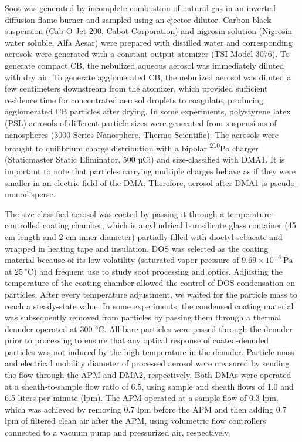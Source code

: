 Soot was generated by incomplete combustion of natural gas in an inverted diffusion flame burner \citep{RN43,RN44} and sampled using an ejector dilutor. Carbon black suspension (Cab-O-Jet 200, Cabot Corporation) and nigrosin solution (Nigrosin water soluble, Alfa Aesar) were prepared with distilled water and corresponding aerosols were generated with a constant output atomizer (TSI Model 3076). To generate compact CB, the nebulized aqueous aerosol was immediately diluted with dry air. To generate agglomerated CB, the nebulized aerosol was diluted a few centimeters downstream from the atomizer, which provided sufficient residence time for concentrated aerosol droplets to coagulate, producing agglomerated CB particles after drying. In some experiments, polystyrene latex (PSL) aerosols of different particle sizes were generated from suspensions of nanospheres (3000 Series Nanosphere, Thermo Scientific). The aerosols were brought to quilibrium charge distribution with a bipolar \textsuperscript{210}Po charger (Staticmaster Static Eliminator, 500 µCi) and size-classified with DMA1. It is important to note that particles carrying multiple charges behave as if they were smaller in an electric field of the DMA. Therefore, aerosol after DMA1 is pseudo-monodisperse.

The size-classified aerosol was coated by passing it through a temperature-controlled coating chamber, which is a cylindrical borosilicate glass container (45 cm length and 2 cm inner diameter) partially filled with dioctyl sebacate and wrapped in heating tape and insulation. DOS was selected as the coating material because of its low volatility (saturated vapor pressure of $9.69\times10^{-6}\ \mathrm{Pa}$ at $25\ \mathrm{^{\circ}C}$) and frequent use to study soot processing and optics.
Adjusting the temperature of the coating chamber allowed the control of DOS condensation on particles. After every temperature adjustment, we waited for the particle mass to reach a steady-state value. In some experiments, the condensed coating material was subsequently removed from particles by passing them through a thermal denuder operated at 300 °C. All bare particles were passed through the denuder prior to processing to ensure that any optical response of coated-denuded particles was not induced by the high temperature in the denuder. Particle mass and electrical mobility diameter of processed aerosol were measured by sending the flow through the APM and DMA2, respectively. Both DMAs were operated at a sheath-to-sample flow ratio of 6.5, using sample and sheath flows of 1.0 and 6.5 liters per minute (lpm). The APM operated at a sample flow of 0.3 lpm, which was achieved by removing 0.7 lpm before the APM and then adding 0.7 lpm of filtered clean air after the APM, using volumetric flow controllers connected to a vacuum pump and pressurized air, respectively.

